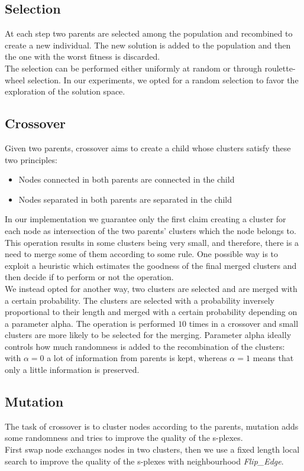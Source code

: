 \documentclass[a4paper,12pt]{article}
\begin{document}
\subsection*{Selection}
At each step two parents are selected among the population and recombined to create a new individual. The new solution is added to the population and then the one with the worst fitness is discarded.\\
The selection can be performed either uniformly at random or through roulette-wheel selection. In our experiments, we opted for a random selection to favor the exploration of the solution space.\\

\subsection*{Crossover}
Given two parents, crossover aims to create a child whose clusters satisfy these two principles:
\begin{itemize}
    \item Nodes connected in both parents are connected in the child
    \item Nodes separated in both parents are separated in the child
\end{itemize}
In our implementation we guarantee only the first claim creating a cluster for each node as intersection of the two parents' clusters which the node belongs to.
This operation results in some clusters being very small, and therefore, there is a need to merge some of them according to some rule. One possible way is to exploit a heuristic which estimates the goodness of the final merged clusters and then decide if to perform or not the operation.\\
We instead opted for another way, two clusters are selected and are merged with a certain probability. The clusters are selected with a probability inversely proportional to their length and merged with a certain probability depending on a parameter alpha. The operation is performed $10$ times in a crossover and small clusters are more likely to be selected for the merging. Parameter alpha ideally controls how much randomness is added to the recombination of the clusters: with $\alpha=0$ a lot of information from parents is kept, whereas $\alpha=1$ means that only a little information is preserved.

\subsection*{Mutation}
The task of crossover is to cluster nodes according to the parents, mutation adds some randomness and tries to improve the quality of the s-plexes.\\
First swap node exchanges nodes in two clusters, then we use a fixed length local search to improve the quality of the s-plexes with neighbourhood \emph{Flip\_Edge}. 
\end{document}
